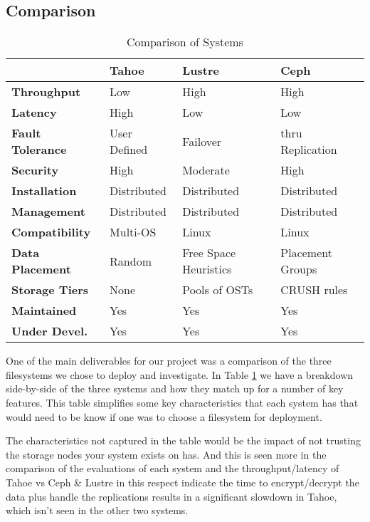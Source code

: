 \documentclass[11pt]{article}
\begin{document}
\subsection{Comparison}
\begin{table}
  \begin{center}
    \begin{tabularx}{\textwidth}{|X|X|X|X|}
      \hline
          {\bf } & {\bf Tahoe} & {\bf Lustre} & {\bf Ceph} \\ \hline
          {\bf Throughput} & Low & High & High \\ \hline
          {\bf Latency} & High & Low & Low \\ \hline
          {\bf Fault Tolerance} & User Defined & Failover & thru Replication \\ \hline
          {\bf Security} & High & Moderate & High \\ \hline
          {\bf Installation} & Distributed & Distributed & Distributed \\ \hline
          {\bf Management} & Distributed & Distributed & Distributed \\ \hline
          {\bf Compatibility} & Multi-OS & Linux & Linux \\ \hline
          {\bf Data Placement} & Random & Free Space Heuristics & Placement Groups \\ \hline
          {\bf Storage Tiers} & None & Pools of OSTs & CRUSH rules \\ \hline
          {\bf Maintained} & Yes & Yes & Yes \\ \hline
          {\bf Under Devel.} & Yes & Yes & Yes \\ \hline
    \end{tabularx}
    \caption{Comparison of Systems}
    \label{tbl:compare}
  \end{center}
\end{table}

One of the main deliverables for our project was a comparison of the
three filesystems we chose to deploy and investigate. In Table
\ref{tbl:compare} we have a breakdown side-by-side of the three
systems and how they match up for a number of key features. This table
simplifies some key characteristics that each system has that would
need to be know if one was to choose a filesystem for deployment.

The characteristics not captured in the table would be the impact of
not trusting the storage nodes your system exists on has. And this is
seen more in the comparison of the evaluations of each system and the
throughput/latency of Tahoe vs Ceph \& Lustre in this respect indicate
the time to encrypt/decrypt the data plus handle the replications
results in a significant slowdown in Tahoe, which isn't seen in the
other two systems.
\end{document}
